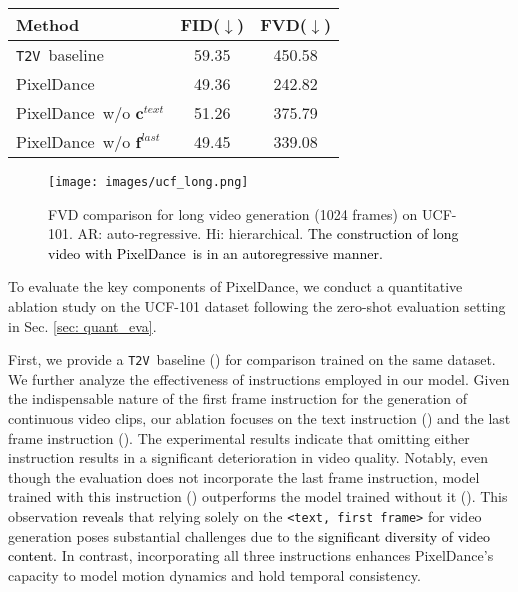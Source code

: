 \documentclass[10pt,twocolumn,letterpaper]{article}
\newcommand{\tcb}{\textcolor{black}}
\newcommand{\tv}{{\texttt{T2V}}}
\newcommand{\ours}{{PixelDance}}
\begin{document}
\begin{table}[ht]
\begin{center}
\small
{}
\begingroup

\setlength{\tabcolsep}{20pt}
\begin{NiceTabular}{@{}lcc@{}}

\toprule
Method &
FID($\downarrow$) &
FVD($\downarrow$) \\

\midrule
{} \tv~baseline & 59.35 & 450.58 \\
\midrule
{} \ours & 49.36 & 242.82 \\
 \ours~w/o $\mathbf{c }^{text}$ & 51.26 & 375.79 \\
 \ours~w/o $\mathbf{f}^{last}$ & 49.45 & 339.08 \\
\bottomrule

\end{NiceTabular}

\endgroup \label{table: ablation}
\end{center}
\end{table}


\begin{figure}[t]
  \centering
  \texttt{[image: images/ucf\_long.png]}
  \caption{
  FVD comparison for long video generation (1024 frames) on UCF-101. AR: auto-regressive. Hi: hierarchical. \tcb{The construction of long video with \ours~is in an autoregressive manner.}
  }
  \label{fig: ucf_long}
\end{figure}


To evaluate the key components of \ours, we conduct a quantitative ablation study on the UCF-101 dataset following the zero-shot evaluation setting in Sec. \ref{sec: quant_eva}.


First, we provide a \tv~baseline () for comparison trained on the same dataset. We further analyze the effectiveness of instructions employed in our model. Given the indispensable nature of the first frame instruction for the generation of continuous video clips, our ablation focuses on the text instruction () and the last frame instruction (). The experimental results indicate that omitting either instruction results in a significant deterioration in video quality. Notably, even though the evaluation does not incorporate the last frame instruction, model trained with this instruction () outperforms the model trained without it ().
This observation \tcb{reveals} that relying solely on the \texttt{<text, first frame>} for video generation poses substantial challenges due to the \tcb{significant diversity of video content.} In contrast, incorporating all three instructions enhances \ours’s capacity to model motion dynamics and hold temporal consistency. 
\end{document}
